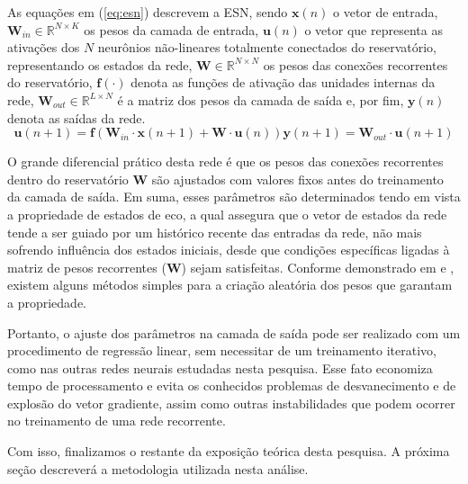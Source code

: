 \documentclass[a4paper, 12pt]{article}
\begin{document}
As equações em (\ref{eq:esn}) descrevem a ESN, sendo $\mathbf{x}(n)$ o vetor de entrada, $\mathbf{W}_{in} \in \mathbb{R}^{N \times K}$ os pesos da camada de entrada, $\mathbf{u}(n)$ o vetor que representa as ativações dos $N$ neurônios não-lineares totalmente conectados do reservatório, representando os estados da rede, $\mathbf{W} \in \mathbb{R}^{N \times N}$ os pesos das conexões recorrentes do reservatório, $\mathbf{f}(\cdot)$ denota as funções de ativação das unidades internas da rede, $\mathbf{W}_{out} \in \mathbb{R}^{L \times N}$ é a matriz dos pesos da camada de saída e, por fim, $\mathbf{y}(n)$ denota as saídas da rede.
\begin{subequations}\label{eq:esn}
\begin{equation}
\mathbf{u}(n+1) = \mathbf{f}(\mathbf{W}_{in} \cdot \mathbf{x}(n+1) + \mathbf{W} \cdot \mathbf{u}(n))
\end{equation}
\begin{equation}
\mathbf{y}(n+1) = \mathbf{W}_{out} \cdot \mathbf{u}(n+1)
\end{equation}
\end{subequations}

O grande diferencial prático desta rede é que os pesos das conexões recorrentes dentro do reservatório $\mathbf{W}$ são ajustados com valores fixos antes do treinamento da camada de saída. Em suma, esses parâmetros são determinados tendo em vista a propriedade de estados de eco, a qual assegura que o vetor de estados da rede tende a ser guiado por um histórico recente das entradas da rede, não mais sofrendo influência dos estados iniciais, desde que condições específicas ligadas à matriz de pesos recorrentes ($\mathbf{W}$) sejam satisfeitas. Conforme demonstrado em \cite{yildiz2012re} e \cite{gallicchio2018design}, existem alguns métodos simples para a criação aleatória dos pesos que garantam a propriedade. 

Portanto, o ajuste dos parâmetros na camada de saída pode ser realizado com um procedimento de regressão linear, sem necessitar de um treinamento iterativo, como nas outras redes neurais estudadas nesta pesquisa. Esse fato economiza tempo de processamento e evita os conhecidos problemas de desvanecimento e de explosão do vetor gradiente, assim como outras instabilidades que podem ocorrer no treinamento de uma rede recorrente. 

Com isso, finalizamos o restante da exposição teórica desta pesquisa. A próxima seção descreverá  a metodologia utilizada nesta análise.
\end{document}
